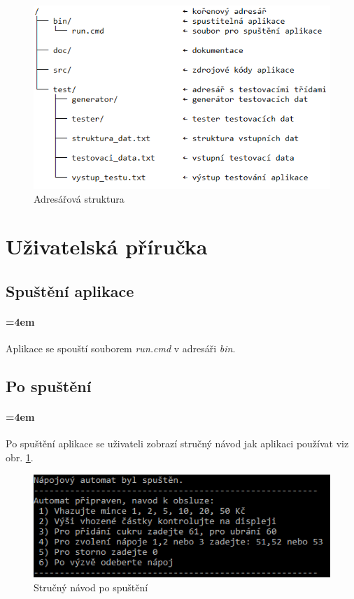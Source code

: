 \documentclass[12pt,a4paper]{article}
\begin{document}
\begin{figure}[H]	
	\centering
	\includegraphics[width=\textwidth]{images/adresar}
	\caption{Adresářová struktura}
\end{figure}

\section{Uživatelská příručka}

\subsection{Spuštění aplikace}

\paragraph{\parindent=4em}{	
	Aplikace se spouští souborem {\it run.cmd} v adresáři {\it bin}.
}

\subsection{Po spuštění}

\paragraph{\parindent=4em}{	
	Po spuštění aplikace se uživateli zobrazí stručný návod jak aplikaci používat viz obr. \ref{fig:pospusteni}.
}

\begin{figure}[H]	
	\centering
	\includegraphics[width=\textwidth]{images/spusteni}
	\caption{Stručný návod po spuštění}
	\label{fig:pospusteni}
\end{figure}
\end{document}
